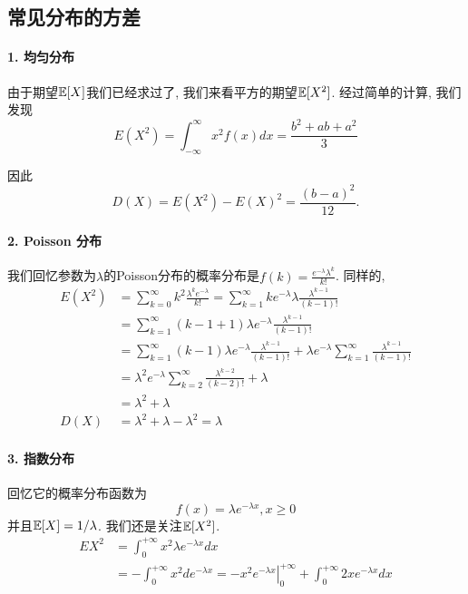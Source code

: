    

    \subsection{常见分布的方差}
    \paragraph{1. 均匀分布} 由于期望$\mathbb E[X]$我们已经求过了, 我们来看平方的期望$\mathbb E[X^2]$. 经过简单的计算, 我们发现$$
    E\left(X^2\right)=\int_{-\infty}^{\infty} x^2 f(x) d x=\frac{b^2+a b+a^2}{3}
    $$
    
    因此
    $$
    D(X)=E\left(X^2\right)-E(X)^2=\frac{(b-a)^2}{12}.
    $$

    \paragraph{2. Poisson 分布} 我们回忆参数为$\lambda$的Poisson分布的概率分布是$f(k )=\frac{e^{-\lambda} \lambda^k}{k !}$. 同样的, 
    $$
    \begin{aligned}
    E\left(X^2\right) & =\sum_{k=0}^{\infty} k^2 \frac{\lambda^k e^{-\lambda}}{k !}=\sum_{k=1}^{\infty} k e^{-\lambda} \lambda \frac{\lambda^{k-1}}{(k-1) !} \\
    & =\sum_{k=1}^{\infty}(k-1+1) \lambda e^{-\lambda} \frac{\lambda^{k-1}}{(k-1) !} \\
    & =\sum_{k=1}^{\infty}(k-1) \lambda e^{-\lambda} \frac{\lambda^{k-1}}{(k-1) !}+\lambda e^{-\lambda} \sum_{k=1}^{\infty} \frac{\lambda^{k-1}}{(k-1) !} \\
    & =\lambda^2 e^{-\lambda} \sum_{k=2}^{\infty} \frac{\lambda^{k-2}}{(k-2) !}+\lambda \\
    & =\lambda^2+\lambda \\
    D(X) & =\lambda^2+\lambda-\lambda^2=\lambda
    \end{aligned}
    $$

    \paragraph{3. 指数分布} 回忆它的概率分布函数为$$
    f(x)=\lambda e^{-\lambda x}, x \geq 0
    $$并且$\mathbb E[X]=1/\lambda$. 我们还是关注$\mathbb E[X^2]$. 
    $$
\begin{aligned}
E X^2 & =\int_0^{+\infty} x^2 \lambda e^{-\lambda x} d x \\
& =-\int_0^{+\infty} x^2 d e^{-\lambda x}=-\left.x^2 e^{-\lambda x}\right|_0 ^{+\infty}+\int_0^{+\infty} 2 x e^{-\lambda x} d x 
\end{aligned}
$$

